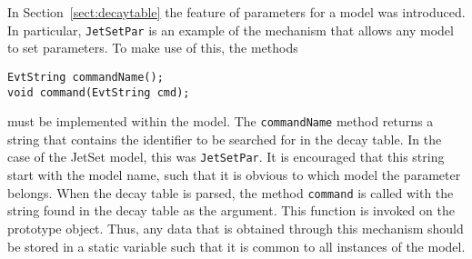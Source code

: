 In Section~\ref{sect:decaytable} the feature of parameters
for a model was introduced. In particular, 
{\tt JetSetPar} is an example of the mechanism 
that allows any model to set parameters.
To make use of this, the 
methods
\begin{verbatim}
EvtString commandName();
void command(EvtString cmd);
\end{verbatim}
must be implemented within the model.
The {\tt commandName} method returns a string that contains the identifier
to be searched for in the decay table. In the case of the
JetSet model, this was {\tt JetSetPar}. It is encouraged that this
string start with the model name, such that it is obvious 
to which model the parameter belongs. When the decay table
is parsed, the method {\tt command} is called
with the string found in the decay table as the argument.
This function is invoked on the prototype object. Thus,
any data that is obtained through this mechanism should be stored
in a static variable such that it is common to all instances of the model.
